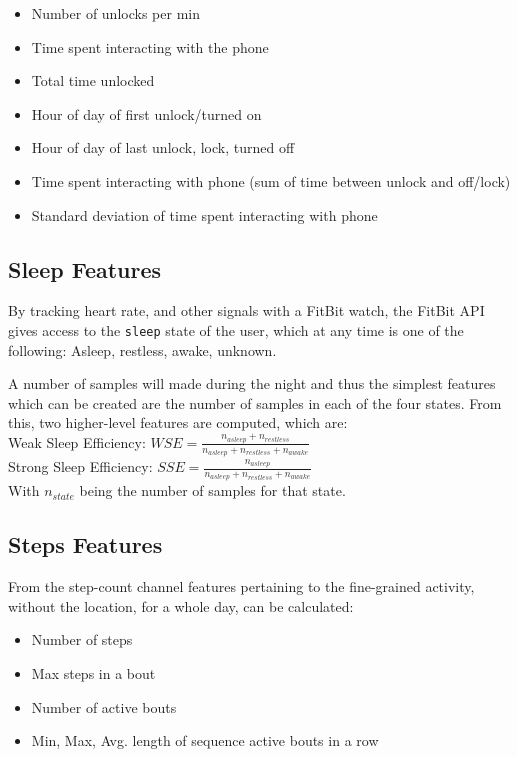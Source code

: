 \begin{itemize}
    \item Number of unlocks per min
    \item Time spent interacting with the phone
    \item Total time unlocked
    \item Hour of day of first unlock/turned on
    \item Hour of day of last unlock, lock, turned off
    \item Time spent interacting with phone (sum of time between unlock and off/lock)
    \item Standard deviation of time spent interacting with phone
\end{itemize}


\subsection{Sleep Features}
By tracking heart rate, and other signals with a FitBit watch, the FitBit API gives access to the \verb|sleep| state of the user, which at any time is one of the following: Asleep, restless, awake, unknown.

A number of samples will made during the night and thus the simplest features which can be created are the number of samples in each of the four states. 
From this, two higher-level features are computed, which are: \\

Weak Sleep Efficiency: $WSE = \frac{n_{asleep} + n_{restless}}{n_{asleep} + n_{restless} + n_{awake}}$\\

Strong Sleep Efficiency: $SSE = \frac{n_{asleep}}{n_{asleep} + n_{restless} + n_{awake}}$\\

With $n_{state}$ being the number of samples for that state.


\subsection{Steps Features}
From the step-count channel features pertaining to the fine-grained activity, without the location, for a whole day, can be calculated:

\begin{itemize}
    \item Number of steps
    \item Max steps in a bout
    \item Number of active bouts
    \item Min, Max, Avg. length of sequence active bouts in a row
\end{itemize}
    
